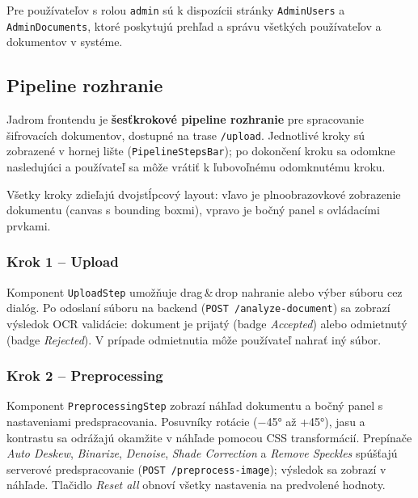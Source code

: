 Pre používateľov s rolou \texttt{admin} sú k dispozícii stránky \texttt{AdminUsers} a \texttt{AdminDocuments}, ktoré poskytujú prehľad a správu všetkých používateľov a dokumentov v systéme.

\subsection{Pipeline rozhranie}

Jadrom frontendu je \textbf{šesťkrokové pipeline rozhranie} pre spracovanie šifrovacích dokumentov, dostupné na trase \texttt{/upload}. Jednotlivé kroky sú zobrazené v hornej lište (\texttt{PipelineStepsBar}); po dokončení kroku sa odomkne nasledujúci a používateľ sa môže vrátiť k ľubovoľnému odomknutému kroku.

Všetky kroky zdieľajú dvojstĺpcový layout: vľavo je plnoobrazovkové zobrazenie dokumentu (canvas s bounding boxmi), vpravo je bočný panel s ovládacími prvkami.

\subsubsection{Krok 1 – Upload}

Komponent \texttt{UploadStep} umožňuje drag\,\&\,drop nahranie alebo výber súboru cez dialóg. Po odoslaní súboru na backend (\texttt{POST /analyze-document}) sa zobrazí výsledok OCR validácie: dokument je prijatý (badge \textit{Accepted}) alebo odmietnutý (badge \textit{Rejected}). V prípade odmietnutia môže používateľ nahrať iný súbor.


\subsubsection{Krok 2 – Preprocessing}

Komponent \texttt{PreprocessingStep} zobrazí náhľad dokumentu a bočný panel s nastaveniami predspracovania. Posuvníky rotácie (−45° až +45°), jasu a kontrastu sa odrážajú okamžite v náhľade pomocou CSS transformácií. Prepínače \textit{Auto Deskew}, \textit{Binarize}, \textit{Denoise}, \textit{Shade Correction} a \textit{Remove Speckles} spúšťajú serverové predspracovanie (\texttt{POST /preprocess-image}); výsledok sa zobrazí v náhľade. Tlačidlo \textit{Reset all} obnoví všetky nastavenia na predvolené hodnoty.


